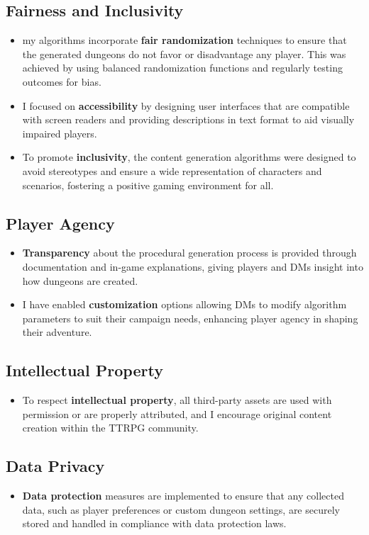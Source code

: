 \documentclass[10pt,twocolumn]{article}
\begin{document}
\subsection{Fairness and Inclusivity}
\begin{itemize}
    \item my algorithms incorporate \textbf{fair randomization} techniques to ensure that the generated dungeons do not favor or disadvantage any player. This was achieved by using balanced randomization functions and regularly testing outcomes for bias.
    \item I focused on \textbf{accessibility} by designing user interfaces that are compatible with screen readers and providing descriptions in text format to aid visually impaired players.
    \item To promote \textbf{inclusivity}, the content generation algorithms were designed to avoid stereotypes and ensure a wide representation of characters and scenarios, fostering a positive gaming environment for all.
\end{itemize}

\subsection{Player Agency}
\begin{itemize}
    \item \textbf{Transparency} about the procedural generation process is provided through documentation and in-game explanations, giving players and DMs insight into how dungeons are created.
    \item I have enabled \textbf{customization} options allowing DMs to modify algorithm parameters to suit their campaign needs, enhancing player agency in shaping their adventure.
\end{itemize}

\subsection{Intellectual Property}
\begin{itemize}
    \item To respect \textbf{intellectual property}, all third-party assets are used with permission or are properly attributed, and I encourage original content creation within the TTRPG community.
\end{itemize}

\subsection{Data Privacy}
\begin{itemize}
    \item \textbf{Data protection} measures are implemented to ensure that any collected data, such as player preferences or custom dungeon settings, are securely stored and handled in compliance with data protection laws.
\end{itemize}
\end{document}
